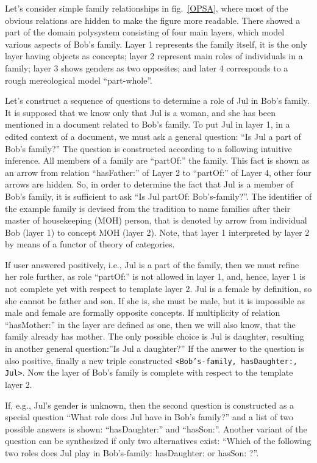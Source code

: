 \documentclass[conference]{IEEEtran}
\begin{document}
Let's consider simple family relationships in fig.~\ref{OPSA}, where
most of the obvious relations are hidden to make the figure more
readable.  There showed a part of the domain polysystem consisting of four
main layers, which model various aspects of Bob's family.  Layer 1
represents the family itself, it is the only layer having objects as
concepts; layer 2 represent main roles of individuals in a family;
layer 3 shows genders as two opposites; and later 4 corresponds to
a rough mereological model ``part-whole''.

Let's construct a sequence of questions to determine a role of Jul in Bob's family.  It is supposed that we know only that Jul is a woman, and she has been mentioned in a document related to Bob's family.  To put Jul in layer 1, in a edited context of a document, we must ask a general question: ``Is Jul a part of Bob's family?''  The question is constructed according to a following intuitive inference.  All members of a family are ``partOf:'' the family.  This fact is shown as an arrow from relation ``hasFather:'' of Layer 2 to ``partOf:'' of Layer 4, other four arrows are hidden.  So, in order to determine the fact that Jul is a member of Bob's family, it is sufficient to ask ``Is Jul partOf: Bob's-family?''.  The identifier of the example family is devised from the tradition to name families after their master of housekeeping (MOH) person, that is denoted by arrow from individual Bob (layer 1) to concept MOH (layer 2).  Note, that layer 1 interpreted by layer 2 by means of a functor of theory of categories.

If user answered positively, i.e., Jul is a part of the family, then
we must refine her role further, as role ``partOf:'' is not allowed in
layer 1, and, hence, layer 1 is not complete yet with respect to
template layer 2.  Jul is a female by definition, so she cannot be
father and son.  If she is, she must be male, but it is impossible as
male and female are formally opposite concepts.  If multiplicity of
relation ``hasMother:'' in the layer are defined as one, then we will
also know, that the family already has mother.  The only possible
choice is Jul is daughter, resulting in another general question:''Is
Jul a daughter?''  If the answer to the question is also positive,
finally a new triple constructed \texttt{<Bob's-family, hasDaughter:,
  Jul>}.  Now the layer of Bob's family is complete with respect to
the template layer 2.

If, e.g., Jul's gender is unknown, then the second question is
constructed as a special question ``What role does Jul have in Bob's
family?'' and a list of two possible answers is shown:
``hasDaughter:'' and ``hasSon:''.  Another variant of the question can
be synthesized if only two alternatives exist: ``Which of the
following two roles does Jul play in Bob's-family: hasDaughter: or
hasSon: ?''.
\end{document}
